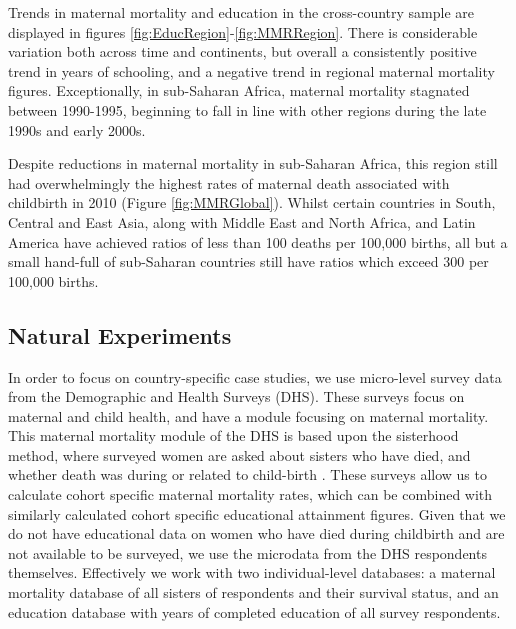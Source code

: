 \documentclass{article}[12pt,subeqn]
\begin{document}
\begin{spacing}{1.4}
Trends in maternal mortality and education in the cross-country sample are 
displayed in figures \ref{fig:EducRegion}-\ref{fig:MMRRegion}. There is 
considerable variation both across time and continents, but overall a 
consistently positive trend in years of schooling, and a negative trend in 
regional maternal mortality figures. Exceptionally, in sub-Saharan Africa, 
maternal mortality stagnated between 1990-1995, beginning to fall in line with 
other regions during the late 1990s and early 2000s.

Despite reductions in maternal mortality in sub-Saharan Africa, this region still 
had overwhelmingly the highest rates of maternal death associated with childbirth 
in 2010 (Figure \ref{fig:MMRGlobal}). Whilst certain countries in South, Central 
and East Asia, along with Middle East and North Africa, and Latin America have 
achieved ratios of less than 100 deaths per 100,000 births, all but a small 
hand-full of sub-Saharan countries still have ratios which exceed 300 per 100,000 
births.


\subsection{Natural Experiments}
\label{sscn:dataexp}
In order to focus on country-specific case studies, we use micro-level survey 
data from the Demographic and Health Surveys (DHS). These surveys focus on 
maternal and child health, and have a module focusing on maternal mortality. This 
maternal mortality module of the DHS is based upon the sisterhood method, where 
surveyed women are asked about sisters who have died, and whether death was during 
or related to child-birth \citep{RutsteinRojas2006}. These surveys allow us to 
calculate cohort specific maternal mortality rates, which can be combined with 
similarly calculated cohort specific educational attainment figures. Given that 
we do not have educational data on women who have died during childbirth and are 
not available to be surveyed, we use the microdata from the DHS respondents 
themselves.  Effectively we work with two individual-level databases: a maternal 
mortality database of all sisters of respondents and their survival status, and 
an education database with years of completed education of all survey respondents.


\end{spacing}
\end{document}
